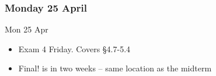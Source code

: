 \documentclass[cal1spr16Lectures.tex]{subfiles}
\begin{document}

\subsubsection{\bf Monday 25 April}

\begin{frame}[allowframebreaks]{Mon 25 Apr}
\begin{itemize}
\item Exam 4 Friday.  Covers \S 4.7-5.4
\item Final! is in two weeks  -- same location as the midterm
\end{itemize}
\end{frame}


\end{document}
